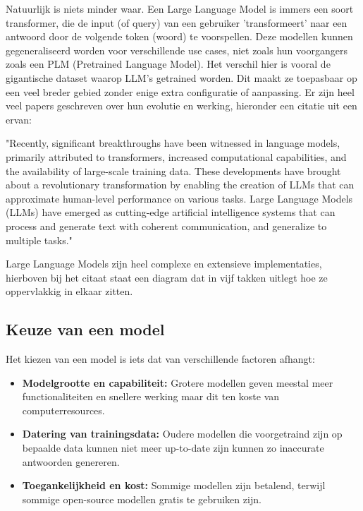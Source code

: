 Natuurlijk is niets minder waar.
Een Large Language Model is immers een soort transformer, die de input (of query) van een gebruiker 'transformeert' naar een antwoord door de volgende token (woord) te voorspellen.
Deze modellen kunnen gegeneraliseerd worden voor verschillende use cases, niet zoals hun voorgangers zoals een PLM (Pretrained Language Model).
Het verschil hier is vooral de gigantische dataset waarop LLM's getrained worden.
Dit maakt ze toepasbaar op een veel breder gebied zonder enige extra configuratie of aanpassing.
Er zijn heel veel papers geschreven over hun evolutie en werking, hieronder een citatie uit een ervan:

\begin{displayquote}
	"Recently, significant breakthroughs have been witnessed in language models, primarily attributed to transformers, increased computational capabilities, and the availability of large-scale training data.
	These developments have brought about a revolutionary transformation by enabling the creation of LLMs that can approximate human-level performance on various tasks.
	Large Language Models (LLMs) have emerged as cutting-edge artificial intelligence systems that can process and generate text with coherent communication, and generalize to multiple tasks."\autocite{ACOoLLM}
	\begin{figure}[h]
		\centering
	\end{figure}


\end{displayquote}

Large Language Models zijn heel complexe en extensieve implementaties, hierboven bij het citaat staat een diagram dat in vijf takken uitlegt hoe ze oppervlakkig in elkaar zitten.

\subsection{Keuze van een model}
Het kiezen van een model is iets dat van verschillende factoren afhangt:

\begin{itemize}
	\item \textbf{Modelgrootte en capabiliteit:} Grotere modellen geven meestal meer functionaliteiten en snellere werking maar dit ten koste van computerresources.
	\item \textbf{Datering van trainingsdata:} Oudere modellen die voorgetraind zijn op bepaalde data kunnen niet meer up-to-date zijn kunnen zo inaccurate antwoorden genereren.
	\item \textbf{Toegankelijkheid en kost:} Sommige modellen zijn betalend, terwijl sommige open-source modellen gratis te gebruiken zijn.
\end{itemize}

